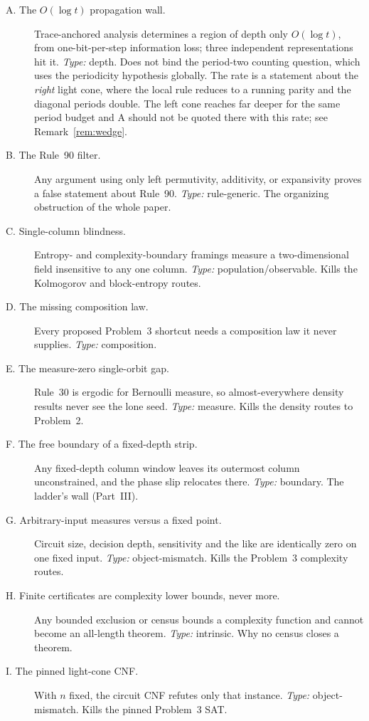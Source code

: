 \documentclass[11pt]{article}
\theoremstyle{definition}
\begin{document}
\begin{description}
\item[A. The $O(\log t)$ propagation wall.] Trace-anchored analysis determines a
  region of depth only $O(\log t)$, from one-bit-per-step information loss; three
  independent representations hit it. \emph{Type:} depth. Does not bind the
  period-two counting question, which uses the periodicity hypothesis globally.
  The rate is a statement about the \emph{right} light cone, where the local
  rule reduces to a running parity and the diagonal periods double. The left
  cone reaches far deeper for the same period budget and A should not be quoted
  there with this rate; see Remark~\ref{rem:wedge}.
\item[B. The Rule~90 filter.] Any argument using only left permutivity,
  additivity, or expansivity proves a false statement about Rule~90.
  \emph{Type:} rule-generic. The organizing obstruction of the whole paper.
\item[C. Single-column blindness.] Entropy- and complexity-boundary framings
  measure a two-dimensional field insensitive to any one column. \emph{Type:}
  population/observable. Kills the Kolmogorov and block-entropy routes.
\item[D. The missing composition law.] Every proposed Problem~3 shortcut needs a
  composition law it never supplies. \emph{Type:} composition.
\item[E. The measure-zero single-orbit gap.] Rule~30 is ergodic for Bernoulli
  measure, so almost-everywhere density results never see the lone seed.
  \emph{Type:} measure. Kills the density routes to Problem~2.
\item[F. The free boundary of a fixed-depth strip.] Any fixed-depth column window
  leaves its outermost column unconstrained, and the phase slip relocates there.
  \emph{Type:} boundary. The ladder's wall (Part~III).
\item[G. Arbitrary-input measures versus a fixed point.] Circuit size, decision
  depth, sensitivity and the like are identically zero on one fixed input.
  \emph{Type:} object-mismatch. Kills the Problem~3 complexity routes.
\item[H. Finite certificates are complexity lower bounds, never more.] Any
  bounded exclusion or census bounds a complexity function and cannot become an
  all-length theorem. \emph{Type:} intrinsic. Why no census closes a theorem.
\item[I. The pinned light-cone CNF.] With $n$ fixed, the circuit CNF refutes only
  that instance. \emph{Type:} object-mismatch. Kills the pinned Problem~3 SAT.
\end{description}
\end{document}
